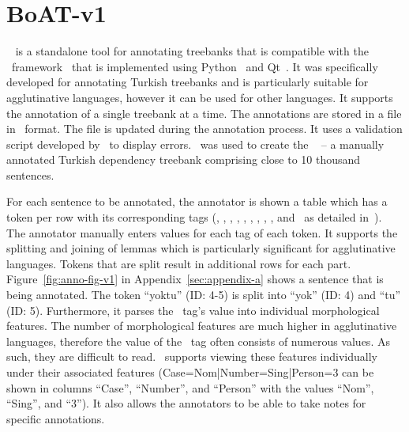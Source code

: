 \section{BoAT-v1}
\label{sec:boatvone}

\boatvone~\cite{turk-etal-2019-turkish} is a standalone tool for annotating treebanks that is compatible with the \ud\ framework~\cite{UD} that is implemented using Python~\cite{python} and Qt~\cite{qt}.
It was specifically developed for annotating Turkish treebanks and is particularly suitable for agglutinative languages, however it can be used for other languages.
It supports the annotation of a single treebank at a time.
The annotations are stored in a file in \conllu\ format.
The file is updated during the annotation process.
It uses a validation script developed by \ud\ to display errors.
\boatvone\ was used to create the \bountreebank~\cite{turk2021resources,UD-Boun-Treebank} -- a manually annotated Turkish dependency treebank comprising close to 10 thousand sentences.

For each sentence to be annotated, the annotator is shown a table which has a token per row with its corresponding tags (\id, \form, \udlemma, \upos, \xpos, \feats, \head, \deprel, \deps, and \misc\ as detailed in~\cite{turk-etal-2019-turkish}).
The annotator manually enters values for each tag of each token.
It supports the splitting and joining of lemmas which is particularly significant for agglutinative languages.
Tokens that are split result in additional rows for each part.
Figure~\ref{fig:anno-fig-v1} in Appendix~\ref{sec:appendix-a} shows a sentence that is being annotated.
The token ``yoktu'' (ID: 4-5) is split into ``yok'' (ID: 4) and ``tu'' (ID: 5). 
Furthermore, it parses the \feats\ tag's value into individual morphological features.
The number of morphological features are much higher in agglutinative languages, therefore the value of the \feats\ tag often consists of numerous values.
As such, they are difficult to read.
\boatvone\ supports viewing these features individually under their associated features (Case=Nom|Number=Sing|Person=3 can be shown in columns ``Case'', ``Number'', and ``Person'' with the values ``Nom'', ``Sing'', and ``3'').
It also allows the annotators to be able to take notes for specific annotations.
